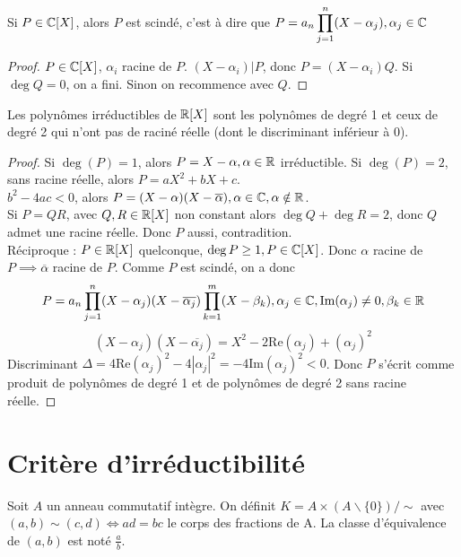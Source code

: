 \documentclass[]{report}
\begin{document}
    \begin{cor}{}{}
        Si $P\in\mathbb{C}[X]$, alors $P$ est scindé, c'est à dire que $\displaystyle{P=a_n\prod_{j=1}^n(X-\alpha_j)},\alpha_j\in\mathbb{C}$
    \end{cor}

    \begin{proof}
        $P\in\mathbb{C}[X]$, $\alpha_i$ racine de $P$. $(X-\alpha_i)|P$, donc $P=(X-\alpha_i)Q$. Si $\deg Q=0$, on a fini. Sinon on recommence avec $Q$.
    \end{proof}

    \begin{prop}{}{}
        Les polynômes irréductibles de $\mathbb{R}[X]$ sont les polynômes de degré 1 et ceux de degré 2 qui n'ont pas de raciné réelle (dont le discriminant inférieur à 0).
    \end{prop}

    \begin{proof}
        Si $\deg(P)=1$, alors $P=X-\alpha,\alpha\in\mathbb{R}$ irréductible. Si $\deg (P)=2$, sans racine réelle, alors $P=aX^2+bX+c$.\\
        $b^2-4ac<0$, alors $P=(X-\alpha)(X-\overline{\alpha}),\alpha\in\mathbb{C},\alpha\notin\mathbb{R}$.\\
        Si $P=QR$, avec $Q,R\in\mathbb{R}[X]$ non constant alors $\deg Q+\deg R=2$, donc $Q$ admet une racine réelle. Donc $P$ aussi, contradition.\\
        Réciproque : $P\in\mathbb{R}[X]$ quelconque, $\deg P\ge 1,P\in\mathbb{C}[X]$. Donc $\alpha$ racine de $P\implies \overline{\alpha}$ racine de $P$. Comme $P$ est scindé, on a donc
        \[P=a_n\prod_{j=1}^{n}(X-\alpha_j)(X-\overline{\alpha_j})\prod_{k=1}^{m}(X-\beta_k),\alpha_j\in\mathbb{C},\text{Im}(\alpha_j)\neq0,\beta_k\in\mathbb{R}\]
        \[(X-\alpha_j)(X-\overline{\alpha_j})=X^2-2\text{Re}(\alpha_j)+(\alpha_j)^2\]
        Discriminant $\Delta=4\text{Re}(\alpha_j)^2-4|\alpha_j|^2=-4\text{Im}(\alpha_j)^2<0$. Donc $P$ s'écrit comme produit de polynômes de degré 1 et de polynômes de degré 2 sans racine réelle.
    \end{proof}

    \section{Critère d'irréductibilité}

    \begin{df}{}{}
        Soit $A$ un anneau commutatif intègre. On définit $K=A\times(A\backslash\{0\})/\sim$ avec $(a,b)\sim(c,d)\iff ad=bc$ le corps des fractions de A. La classe d'équivalence de $(a,b)$ est noté $\frac{a}{b}$.
    \end{df}
\end{document}
